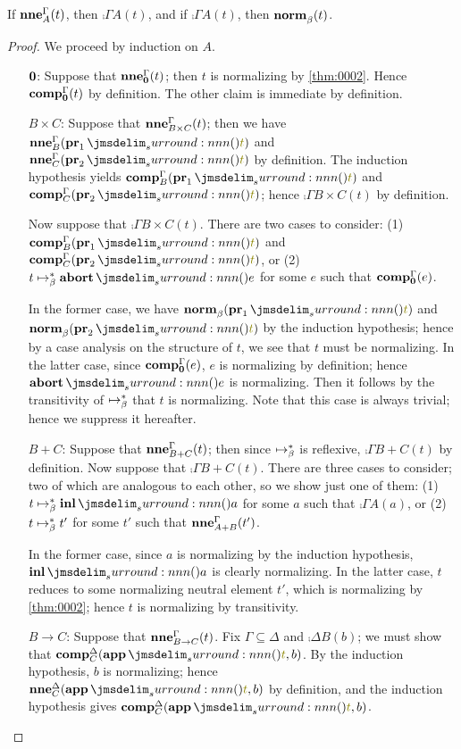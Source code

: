 \documentclass[a4paper]{article}
\begin{document}
\begin{theorem}[\cref{ax:0000}]\label{thm:0006}
  If $\operatorname{\mathbf{nne}}^{\Gamma}_{A}(t)$, then $\comp{\Gamma}{A}(t)$, and if $\comp{\Gamma}{A}(t)$, then $\operatorname{\mathbf{norm}}^{}_{\beta}(t)$.
\end{theorem}
\begin{proof}
  We proceed by induction on $A$.
  \begin{itemize}
  \item[$\mathbf{0}$:] Suppose that $\operatorname{\mathbf{nne}}^{\Gamma}_{\mathbf{0}}(t)$; then $t$ is normalizing by \cref{thm:0002}.
    Hence $\operatorname{\mathbf{comp}}^{\Gamma}_{\mathbf{0}}(t)$ by definition.
    The other claim is immediate by definition.
  \item[$B \times C$:] Suppose that $\operatorname{\mathbf{nne}}^{\Gamma}_{B \times C}(t)$; then we have $\neu{\Gamma}{B}(\tmPrl{t})$ and $\neu{\Gamma}{C}(\tmPrr{t})$ by definition.
    The induction hypothesis yields $\comp{\Gamma}{B}(\tmPrl{t})$ and $\comp{\Gamma}{C}(\tmPrr{t})$; hence $\comp{\Gamma}{B \times C}(t)$ by definition.
    
    Now suppose that $\comp{\Gamma}{B \times C}(t)$.
    There are two cases to consider: (1) $\comp{\Gamma}{B}(\tmPrl{t})$ and $\comp{\Gamma}{C}(\tmPrr{t})$, or (2) $t \bRed* \tmAbort{e}$ for some $e$ such that $\operatorname{\mathbf{comp}}^{\Gamma}_{\mathbf{0}}(e)$.
    
    In the former case, we have $\norm(\tmPrl{t})$ and $\norm(\tmPrr{t})$ by the induction hypothesis; hence by a case analysis on the structure of $t$, we see that $t$ must be normalizing.
    In the latter case, since $\operatorname{\mathbf{comp}}^{\Gamma}_{\mathbf{0}}(e)$, $e$ is normalizing by definition; hence $\tmAbort{e}$ is normalizing.
    Then it follows by the transitivity of $\bRed*$ that $t$ is normalizing.
    Note that this case is always trivial; hence we suppress it hereafter.
  \item[$B + C$:] Suppose that $\operatorname{\mathbf{nne}}^{\Gamma}_{B + C}(t)$; then since $\bRed*$ is reflexive, $\comp{\Gamma}{B + C}(t)$ by definition.
    Now suppose that $\comp{\Gamma}{B + C}(t)$.
    There are three cases to consider; two of which are analogous to each other, so we show just one of them: (1) $t \bRed* \tmInl{a}$ for some $a$ such that $\comp{\Gamma}{A}(a)$, or (2) $t \bRed* t'$ for some $t'$ such that $\operatorname{\mathbf{nne}}^{\Gamma}_{A + B}(t')$.

    In the former case, since $a$ is normalizing by the induction hypothesis, $\tmInl{a}$ is clearly normalizing.
    In the latter case, $t$ reduces to some normalizing neutral element $t'$, which is normalizing by \cref{thm:0002}; hence $t$ is normalizing by transitivity.
  \item[$B \to C$:] Suppose that $\operatorname{\mathbf{nne}}^{\Gamma}_{B \to C}(t)$.
    Fix $\Gamma \subseteq \Delta$ and $\comp{\Delta}{B}(b)$; we must show that $\comp{\Delta}{C}(\tmApp{t}{b})$.
    By the induction hypothesis, $b$ is normalizing; hence $\neu{\Delta}{C}(\tmApp{t}{b})$ by definition, and the induction hypothesis gives $\comp{\Delta}{C}(\tmApp{t}{b})$.


\end{itemize}
\end{proof}
\end{document}
